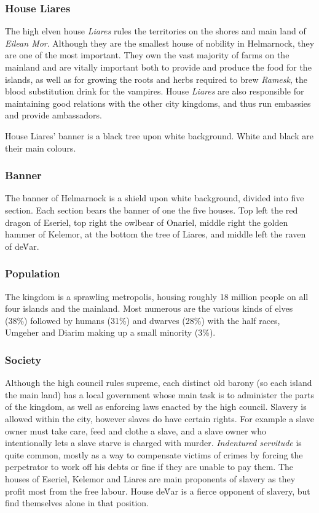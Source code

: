 \subsubsection*{House Liares}

The high elven house \emph{Liares} rules the territories on the shores and
main land of \emph{Eilean Mor}. Although they are the smallest house of
nobility in Helmarnock, they are one of the most important. They own the
vast majority of farms on the mainland and are vitally important both to
provide and produce the food for the islands, as well as for growing the
roots and herbs required to brew \emph{Ramesk}, the blood substitution drink
for the vampires. House \emph{Liares} are also responsible for maintaining
good relations with the other city kingdoms, and thus run embassies and
provide ambassadors.

House Liares' banner is a black tree upon white background. White and black
are their main colours.

\subsubsection*{Banner}

The banner of Helmarnock is a shield upon white background, divided into five
section. Each section bears the banner of one the five houses. Top left the
red dragon of Eseriel, top right the owlbear of Onariel, middle right the
golden hammer of Kelemor, at the bottom the tree of Liares, and middle left
the raven of de\'Var.

\subsubsection*{Population}

The kingdom is a sprawling metropolis, housing roughly 18 million people on
all four islands and the mainland. Most numerous are the various kinds of
elves (38\%) followed by humans (31\%) and dwarves (28\%) with the half
races, Umgeher and Diarim making up a small minority (3\%).

\subsubsection*{Society}

Although the high council rules supreme, each distinct old barony (so each
island the main land) has a local government whose main task is to administer
the parts of the kingdom, as well as enforcing laws enacted by the high council.
Slavery is allowed within the city, however slaves do have certain rights. For
example a slave owner must take care, feed and clothe a slave, and a slave
owner who intentionally lets a slave starve is charged with murder.
\emph{Indentured servitude} is quite common, mostly as a way to compensate
victims of crimes by forcing the perpetrator to work off his debts or fine if
they are unable to pay them. The houses of Eseriel, Kelemor and Liares are main
proponents of slavery as they profit most from the free labour. House de\'Var
is a fierce opponent of slavery, but find themselves alone in that position.

